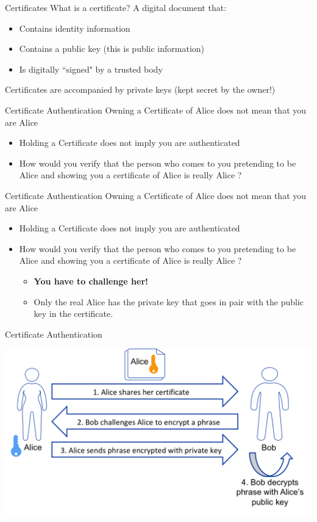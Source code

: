 \documentclass[aspectratio=169]{beamer}
\begin{document}
\begin{frame}{Certificates}
What is a certificate? A digital document that:
\begin{itemize}
\item Contains identity information
\item Contains a public key (this is public information)
\item Is digitally ``signed" by a trusted body 
\end{itemize}
Certificates are accompanied by private keys (kept secret by the owner!)
\end{frame}

\begin{frame}{Certificate Authentication}
Owning a Certificate of Alice does not mean that you are Alice
\begin{itemize}
\item Holding a Certificate does not imply you are authenticated
\item How would you verify that the person who comes to you pretending to be Alice and showing you a certificate of Alice is really Alice ?
\end{itemize}
\end{frame}

\begin{frame}{Certificate Authentication}
Owning a Certificate of Alice does not mean that you are Alice
\begin{itemize}
\item Holding a Certificate does not imply you are authenticated
\item How would you verify that the person who comes to you pretending to be Alice and showing you a certificate of Alice is really Alice ?
\begin{itemize}
\item \textbf{You have to challenge her!}
\item Only the real Alice has the private key that goes in pair with the public key in the certificate.
\end{itemize}
\end{itemize}
\end{frame}

\begin{frame}{{\color{red}Certificate Authentication}}
\begin{center}
\includegraphics[width=0.9\linewidth]{certificate-verification.png}
\end{center}
\end{frame}
\end{document}
